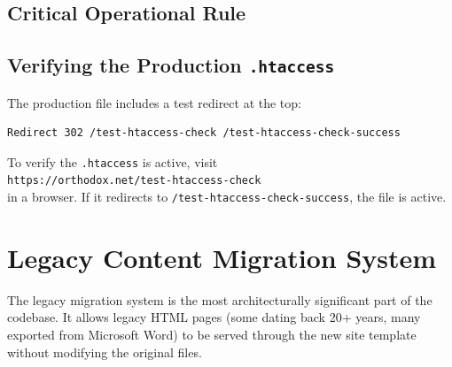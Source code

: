 \documentclass[12pt]{article}
\begin{document}
\subsection{Critical Operational Rule}

\begin{center}
\end{center}

\subsection{Verifying the Production \texttt{.htaccess}}

The production file includes a test redirect at the top:

\begin{lstlisting}[language=bash,numbers=none,basicstyle=\ttfamily\scriptsize]
Redirect 302 /test-htaccess-check /test-htaccess-check-success
\end{lstlisting}

To verify the \texttt{.htaccess} is active, visit\\
\texttt{https://orthodox.net/test-htaccess-check}\\
in a browser. If it redirects to \texttt{/test-htaccess-check-success}, the file is active.

\section{Legacy Content Migration System}

The legacy migration system is the most architecturally significant part of the codebase. It allows legacy HTML pages (some dating back 20+ years, many exported from Microsoft Word) to be served through the new site template without modifying the original files.
\end{document}
